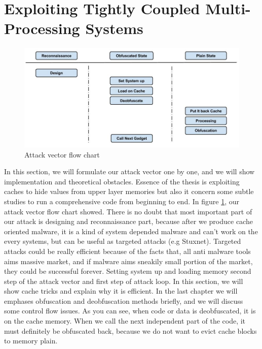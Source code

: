 	\section{Exploiting Tightly Coupled Multi-Processing Systems}
	    \begin{figure}[h!]
	        \centering
	        \includegraphics[width=1\textwidth]{img/attack vector.jpg}
	        \caption{Attack vector flow chart}
	        \label{fig:atackvector}
	    \end{figure}
	    In this section, we will formulate our attack vector one by one, and we will show implementation and theoretical obstacles. Essence of the thesis is exploiting caches to hide values from upper layer memories but also it concern some subtle studies to run a comprehensive code from beginning to end. In figure \ref{fig:atackvector}, our attack vector flow chart showed. There is no doubt that most important part of our attack is designing and reconnaissance part, because after we produce cache oriented malware, it is a kind of system depended malware and can't work on the every systems, but can be useful as targeted attacks (e.g Stuxnet). Targeted attacks could be really efficient because of the facts that, all anti malware tools aims massive market, and if malware aims sneakily small portion of the market, they could be successful forever. Setting system up and loading memory second step of the attack vector and first step of attack loop. In this section, we will show cache tricks and explain why it is efficient. In the last chapter we will emphases obfuscation and deobfuscation methods briefly, and we will discuss some control flow issues. As you can see, when code or data is deobfuscated, it is on the cache memory. When we call the next independent part of the code, it must definitely be obfuscated back, because we do not want to evict cache blocks to memory plain. 
